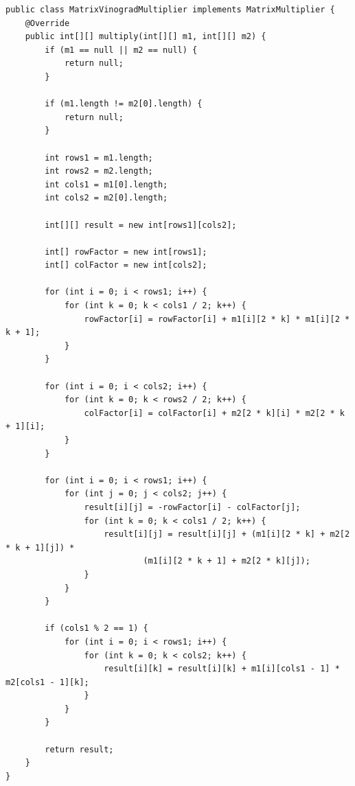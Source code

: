 \documentclass[12pt]{report}
\begin{document}
    \begin{lstlisting}[caption=Алгоритм Копперсмита-Винограда, label=code:vinogradCasual]
    public class MatrixVinogradMultiplier implements MatrixMultiplier {
    @Override
    public int[][] multiply(int[][] m1, int[][] m2) {
        if (m1 == null || m2 == null) {
            return null;
        }

        if (m1.length != m2[0].length) {
            return null;
        }

        int rows1 = m1.length;
        int rows2 = m2.length;
        int cols1 = m1[0].length;
        int cols2 = m2[0].length;

        int[][] result = new int[rows1][cols2];

        int[] rowFactor = new int[rows1];
        int[] colFactor = new int[cols2];

        for (int i = 0; i < rows1; i++) {
            for (int k = 0; k < cols1 / 2; k++) {
                rowFactor[i] = rowFactor[i] + m1[i][2 * k] * m1[i][2 * k + 1];
            }
        }

        for (int i = 0; i < cols2; i++) {
            for (int k = 0; k < rows2 / 2; k++) {
                colFactor[i] = colFactor[i] + m2[2 * k][i] * m2[2 * k + 1][i];
            }
        }

        for (int i = 0; i < rows1; i++) {
            for (int j = 0; j < cols2; j++) {
                result[i][j] = -rowFactor[i] - colFactor[j];
                for (int k = 0; k < cols1 / 2; k++) {
                    result[i][j] = result[i][j] + (m1[i][2 * k] + m2[2 * k + 1][j]) *
                            (m1[i][2 * k + 1] + m2[2 * k][j]);
                }
            }
        }

        if (cols1 % 2 == 1) {
            for (int i = 0; i < rows1; i++) {
                for (int k = 0; k < cols2; k++) {
                    result[i][k] = result[i][k] + m1[i][cols1 - 1] * m2[cols1 - 1][k];
                }
            }
        }

        return result;
    }
}
    \end{lstlisting}
\end{document}
